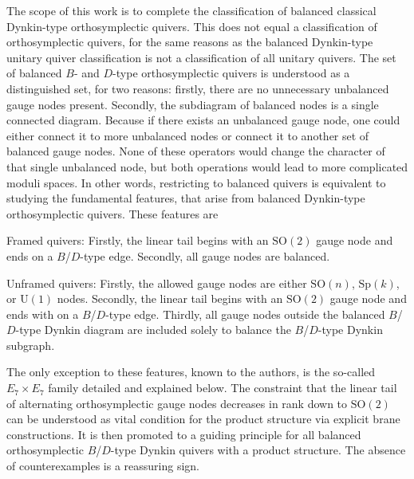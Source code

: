\documentclass[a4paper,11pt]{article}
\newcommand{\urm}{\mathrm{U}}
\newcommand{\sprm}{\mathrm{Sp}}
\newcommand{\sorm}{\mathrm{SO}}
\begin{document}
The scope of this work is to complete the classification of balanced classical Dynkin-type orthosymplectic quivers. This does not equal a classification of orthosymplectic quivers, for the same reasons as the balanced Dynkin-type unitary quiver classification is not a classification of all unitary quivers. The set of balanced $B$- and $D$-type orthosymplectic quivers is understood as a distinguished set, for two reasons: firstly, there are no unnecessary unbalanced gauge nodes present. Secondly, the subdiagram of balanced nodes is a single connected diagram. Because if there exists an unbalanced gauge node, one could either connect it to more unbalanced nodes or connect it to another set of balanced gauge nodes. None of these operators would change the character of that single unbalanced node, but both operations would lead to more complicated moduli spaces. In other words, restricting to balanced quivers is equivalent to studying the fundamental features, that arise from balanced Dynkin-type orthosymplectic quivers. These features are
\begin{compactitem}
\item Framed quivers: Firstly, the linear tail begins with an $\sorm(2)$ gauge node and ends  on a $B$/$D$-type edge. Secondly, all gauge nodes are balanced.
\item Unframed quivers: Firstly, the allowed gauge nodes are either $\sorm(n)$, $\sprm(k)$, or $\urm(1)$ nodes. Secondly, the linear tail begins with an $\sorm(2)$ gauge node and ends with on a $B$/$D$-type edge. Thirdly, all gauge nodes outside the balanced $B$/$D$-type Dynkin diagram are included solely to balance the $B$/$D$-type Dynkin subgraph.
\end{compactitem}
The only exception to these features, known to the authors, is the so-called $E_7 \times E_7$ family detailed and explained below. The constraint that the linear tail of alternating orthosymplectic gauge nodes decreases in rank down to $\sorm(2)$ can be understood as vital condition for the product structure via explicit brane constructions. It is then promoted to a guiding principle for all balanced orthosymplectic $B$/$D$-type Dynkin quivers with a product structure. The absence of counterexamples is a reassuring sign.
\end{document}

